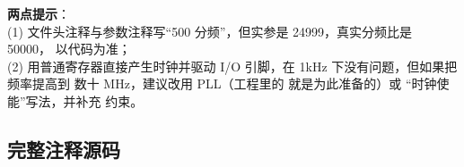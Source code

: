 \begin{warnbox}
\textbf{两点提示}：\\
(1) 文件头注释与参数注释写“500 分频”，但实参是 24999，真实分频比是 50000，
以代码为准；\\
(2) 用普通寄存器直接产生时钟并驱动 I/O 引脚，在 1kHz 下没有问题，但如果把频率提高到
数十 MHz，建议改用 PLL（工程里的  就是为此准备的）或
“时钟使能”写法，并补充  约束。
\end{warnbox}

\subsection{完整注释源码}


